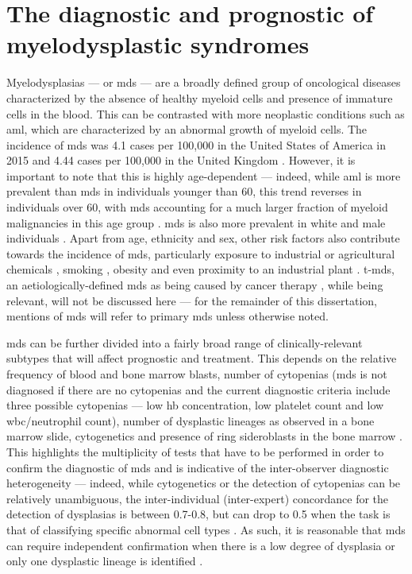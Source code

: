 \section{The diagnostic and prognostic of myelodysplastic syndromes}

Myelodysplasias --- or \ac{mds} --- are a broadly defined group of oncological diseases characterized by the absence of healthy myeloid cells and presence of immature cells in the blood. This can be contrasted with more neoplastic conditions such as \ac{aml}, which are characterized by an abnormal growth of myeloid cells. The incidence of \ac{mds} was 4.1 cases per 100,000 in the United States of America in 2015 \cite{Zeidan2019-jj} and 4.44 cases per 100,000 in the United Kingdom \cite{Roman2016-ad}. However, it is important to note that this is highly age-dependent --- indeed, while \ac{aml} is more prevalent than \ac{mds} in individuals younger than 60, this trend reverses in individuals over 60, with \ac{mds} accounting for a much larger fraction of myeloid malignancies in this age group \cite{Zeidan2019-jj}. \ac{mds} is also more prevalent in white and male individuals \cite{Zeidan2019-jj}. Apart from age, ethnicity and sex, other risk factors also contribute towards the incidence of \ac{mds}, particularly exposure to industrial or agricultural chemicals \cite{Nisse2001-qf,Lv2011-iv,Strom2005-pq}, smoking \cite{Lv2011-iv,Strom2005-pq}, obesity \cite{Ma2009-ws} and even proximity to an industrial plant \cite{Nisse2001-qf}. \Ac{t-mds}, an aetiologically-defined \ac{mds} as being caused by cancer therapy \cite{Kuendgen2021-in}, while being relevant, will not be discussed here --- for the remainder of this dissertation, mentions of \ac{mds} will refer to primary \ac{mds} unless otherwise noted.

\ac{mds} can be further divided into a fairly broad range of clinically-relevant subtypes that will affect prognostic and treatment. This depends on the relative frequency of blood and bone marrow blasts, number of cytopenias (\ac{mds} is not diagnosed if there are no cytopenias and the current diagnostic criteria include three possible cytopenias --- low \ac{hb} concentration, low platelet count and low \ac{wbc}/neutrophil count), number of dysplastic lineages as observed in a bone marrow slide, cytogenetics and presence of ring sideroblasts in the bone marrow \cite{Arber2016-os}. This highlights the multiplicity of tests that have to be performed in order to confirm the diagnostic of \ac{mds} and is indicative of the inter-observer diagnostic heterogeneity --- indeed, while cytogenetics or the detection of cytopenias can be relatively unambiguous, the inter-individual (inter-expert) concordance for the detection of dysplasias is between 0.7-0.8, but can drop to 0.5 when the task is that of classifying specific abnormal cell types \cite{Font2013-lx, Parmentier2012-wm, Della_Porta2015-hw}. As such, it is reasonable that \ac{mds} can require independent confirmation when there is a low degree of dysplasia or only one dysplastic lineage is identified \cite{Arber2016-os}.

